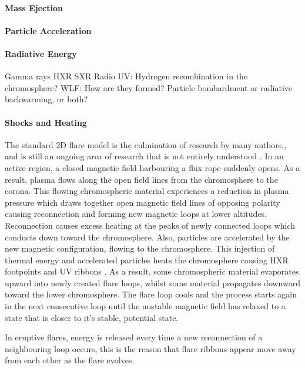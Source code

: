 \paragraph{Mass Ejection}
\paragraph{Particle Acceleration}
\paragraph{Radiative Energy}
Gamma rays
HXR 
SXR
Radio
UV:
    Hydrogen recombination in the chromosphere?
WLF: 
    How are they formed? Particle bombardment or radiative backwarming, or both?
\paragraph{Shocks and Heating}


The standard 2D flare model is the culmination of research by many authors,\citep{1964NASSP..50..451C, 1966Natur.211..695S, 1974SoPh...34..323H, 1976SoPh...50...85K}, and is still an ongoing area of research that is not entirely understood \citep{2011LRSP....8....6S}. In an active region, a closed magnetic field harbouring a flux rope suddenly opens. As a result, plasma flows along the open field lines from the chromosphere to the corona. This flowing chromospheric material experiences a reduction in plasma pressure which draws together open magnetic field lines of opposing polarity causing reconnection and forming new magnetic loops at lower altitudes. Reconnection causes excess heating at the peaks of newly connected loops which conducts down toward the chromosphere. Also, particles are accelerated by the new magnetic configuration, flowing to the chromosphere. This injection of thermal energy and accelerated particles heats the chromosphere causing HXR footpoints \citep{1995ApJ...455..347A} and UV ribbons \citep{2009A&A...493..241F}. As a result, some chromospheric material evaporates upward into newly created flare loops, whilst some material propagates downward toward the lower chromosphere. The flare loop cools and the process starts again in the next consecutive loop until the unstable magnetic field has relaxed to a state that is closer to it's stable,  potential state.

 In eruptive flares, energy is released every time a new reconnection of a neighbouring loop occurs, this is the reason that flare ribbons appear move away from each other as the flare evolves. \\

